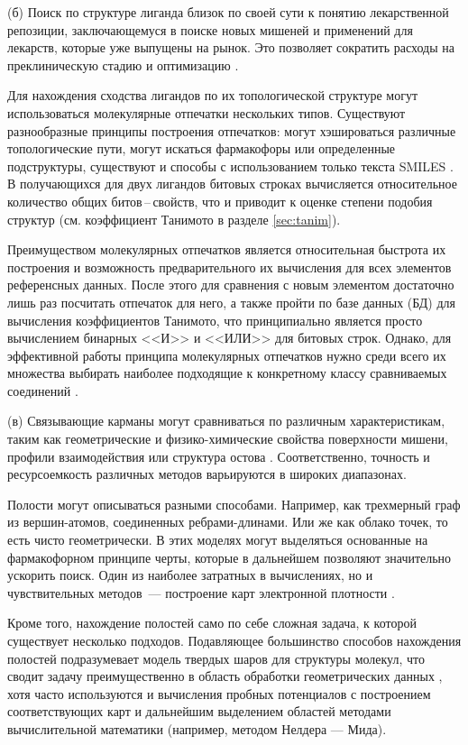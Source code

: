 \documentclass[a4paper,14pt]{article}         %
\begin{document}
(б) Поиск по структуре лиганда близок по своей сути к понятию лекарственной репозиции, заключающемуся в поиске новых мишеней и применений для лекарств, которые уже выпущены на рынок. Это позволяет сократить расходы на преклиническую стадию и оптимизацию \cite{Hall2015, March-Vila2017}.

Для нахождения сходства лигандов по их топологической структуре могут использоваться молекулярные отпечатки нескольких типов. Существуют разнообразные принципы построения отпечатков: могут хэшироваться различные топологические пути, могут искаться фармакофоры или определенные подструктуры, существуют и способы с использованием только текста SMILES \cite{Cereto-Massague2015}. В получающихся для двух лигандов битовых строках вычисляется относительное количество общих битов\,--\,свойств, что и приводит к оценке степени подобия структур (см. коэффициент Танимото в разделе \ref{sec:tanim}). 

Преимуществом молекулярных отпечатков является относительная быстрота их построения и возможность предварительного их вычисления для всех элементов референсных данных. После этого для сравнения с новым элементом достаточно лишь раз посчитать отпечаток для него, а также пройти по базе данных (БД) для вычисления коэффициентов Танимото, что принципиально является просто вычислением бинарных <<И>> и <<ИЛИ>> для битовых строк. Однако, для эффективной работы принципа молекулярных отпечатков нужно среди всего их множества выбирать наиболее подходящие к конкретному классу сравниваемых соединений \cite{Cereto-Massague2015}.

(в) Связывающие карманы могут сравниваться по различным характеристикам, таким как геометрические и физико-химические свойства поверхности мишени, профили взаимодействия или структура остова \cite{Ehrt2016}. Соответственно, точность и ресурсоемкость различных методов варьируются в широких диапазонах.

Полости могут описываться разными способами. Например, как трехмерный граф из вершин-атомов, соединенных ребрами-длинами. Или же как облако точек, то есть чисто геометрически. В этих моделях могут выделяться основанные на фармакофорном принципе черты, которые в дальнейшем позволяют значительно ускорить поиск. Один из наиболее затратных в вычислениях, но и чувствительных методов~--- построение карт электронной плотности \cite{Ehrt2016}.

Кроме того, нахождение полостей само по себе сложная задача, к которой существует несколько подходов. Подавляющее большинство способов нахождения полостей подразумевает модель твердых шаров для структуры молекул, что сводит задачу преимущественно в область обработки геометрических данных \cite {Krone2016}, хотя часто используются и вычисления пробных потенциалов с построением соответствующих карт и дальнейшим выделением областей методами вычислительной математики (например, методом Нелдера — Мида).
\end{document}
